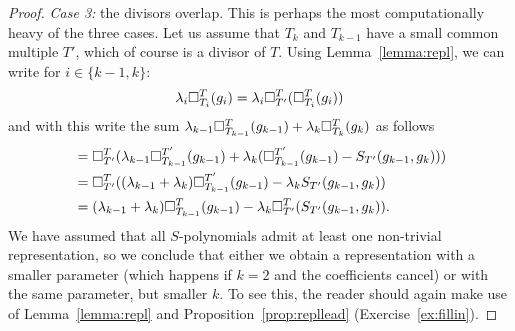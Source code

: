 \begin{proof}
\emph{Case 3:} the divisors overlap. This is perhaps the
most computationally heavy of the three cases. Let us
assume that $T_k$ and $T_{k-1}$ have a small common
multiple $T'$, which of course is a divisor of $T$.
Using Lemma~\ref{lemma:repl}, we can write
for $i\in \{k-1,k\}$:
\[
\lambda_i \square_{T_i}^{T}(g_i)  = 
\lambda_i \square_{T'}^{T}(\square_{T_i}^{T}(g_i))
\]
and with this write the sum $\lambda_{k-1}\square_{T_{k-1}}^{T}(g_{k-1}) +  \lambda_k\square_{T_{k}}^{T}(g_{k})$ as follows
\begin{align*}
 {} &= 
\square_{T'}^{T}(\lambda_{k-1}\square_{T_{k-1}}^{T'}(g_{k-1}) + 
  \lambda_k (\square_{T_{k-1}}^{T'}(g_{k-1}) - S_{T'}(g_{k-1},g_k))) \\
  &=
  	\square_{T'}^{T}((\lambda_{k-1}+\lambda_k)
  		\square_{T_{k-1}}^{T'}(g_{k-1}) 
  -   \lambda_k S_{T'}(g_{k-1},g_k)) \\
  &=
  	(\lambda_{k-1}+\lambda_k)
  		\square_{T_{k-1}}^{T}(g_{k-1}) 
  -   \lambda_k \square_{T'}^{T}(S_{T'}(g_{k-1},g_k)).
\end{align*}
We have assumed that all $S$-polynomials admit at least
one non-trivial representation, so we conclude that either
we obtain a representation with a smaller parameter
(which happens if $k=2$ and the coefficients cancel)
or with the same parameter, but smaller $k$. To see
this, the reader should again make use of 
Lemma~\ref{lemma:repl}
and Proposition~\ref{prop:repllead} (Exercise~\ref{ex:fillin}).
\end{proof}

